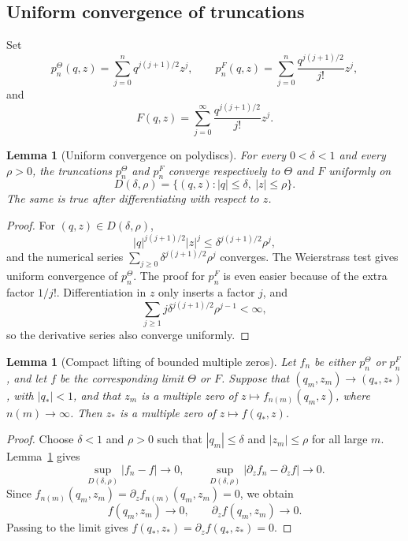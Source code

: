 \documentclass[11pt,a4paper,reqno]{amsart}
\newtheorem{lemma}[theorem]{Lemma}
\theoremstyle{remark}
\begin{document}
\subsection{Uniform convergence of truncations}
Set
\[
        p^{\Theta}_n(q,z)=\sum_{j=0}^n q^{j(j+1)/2}z^j,
        \qquad
        p^F_n(q,z)=\sum_{j=0}^n\frac{q^{j(j+1)/2}}{j!}z^j,
\]
and
\[
        F(q,z)=\sum_{j=0}^{\infty}\frac{q^{j(j+1)/2}}{j!}z^j.
\]

\begin{lemma}[Uniform convergence on polydiscs]\label{lem:uniform-polydisc}
For every \(0<\delta<1\) and every \(\rho>0\), the truncations \(p^\Theta_n\) and \(p^F_n\) converge respectively to \(\Theta\) and \(F\) uniformly on
\[
        D(\delta,\rho)=\{(q,z): |q|\le\delta,\ |z|\le\rho\}.
\]
The same is true after differentiating with respect to \(z\).
\end{lemma}

\begin{proof}
For \((q,z)\in D(\delta,\rho)\),
\[
        |q|^{j(j+1)/2}|z|^j\le \delta^{j(j+1)/2}\rho^j,
\]
and the numerical series \(\sum_{j\ge0}\delta^{j(j+1)/2}\rho^j\) converges.  The Weierstrass test gives uniform convergence of \(p^\Theta_n\).  The proof for \(p^F_n\) is even easier because of the extra factor \(1/j!\).  Differentiation in \(z\) only inserts a factor \(j\), and
\[
        \sum_{j\ge1}j\delta^{j(j+1)/2}\rho^{j-1}<\infty,
\]
so the derivative series also converge uniformly.
\end{proof}

\begin{lemma}[Compact lifting of bounded multiple zeros]\label{lem:compact-lifting}
Let \(f_n\) be either \(p^\Theta_n\) or \(p^F_n\), and let \(f\) be the corresponding limit \(\Theta\) or \(F\).  Suppose that \((q_m,z_m)\to(q_*,z_*)\), with \(|q_*|<1\), and that \(z_m\) is a multiple zero of \(z\mapsto f_{n(m)}(q_m,z)\), where \(n(m)\to\infty\).  Then \(z_*\) is a multiple zero of \(z\mapsto f(q_*,z)\).
\end{lemma}

\begin{proof}
Choose \(\delta<1\) and \(\rho>0\) such that \(|q_m|\le\delta\) and \(|z_m|\le\rho\) for all large \(m\).  Lemma~\ref{lem:uniform-polydisc} gives
\[
        \sup_{D(\delta,\rho)}|f_n-f|\to0,
        \qquad
        \sup_{D(\delta,\rho)}|\partial_z f_n-\partial_z f|\to0.
\]
Since \(f_{n(m)}(q_m,z_m)=\partial_zf_{n(m)}(q_m,z_m)=0\), we obtain
\[
        f(q_m,z_m)\to0,
        \qquad
        \partial_zf(q_m,z_m)\to0.
\]
Passing to the limit gives \(f(q_*,z_*)=\partial_zf(q_*,z_*)=0\).
\end{proof}
\end{document}

